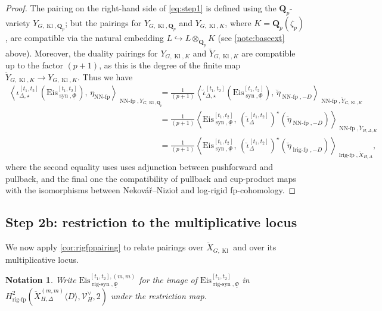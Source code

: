 \documentclass[cjm]{ipart}
\theoremstyle{plain}
\newtheorem{notation}[theorem]{Notation}
\theoremstyle{remark}
\DeclareMathOperator{\Kl}{Kl}
\DeclareMathOperator{\lrigfp}{lrig-fp}
\DeclareMathOperator{\NNfp}{NN-fp}
\DeclareMathOperator{\rigfp}{rig-fp}
\DeclareMathOperator{\rigsyn}{rig-syn}
\DeclareMathOperator{\syn}{syn}
\newcommand{\Eis}{\mathrm{Eis}}
\newcommand{\Nek}{Nekov\'a\v{r}\xspace}
\newcommand{\Niz}{Nizio\l\xspace}
\newcommand{\QQ}{\mathbf{Q}}
\newcommand{\Qp}{\QQ_p}
\newcommand{\cV}{\mathcal{V}}
\newcommand{\into}{\hookrightarrow}
\numberwithin{equation}{subsection}
\begin{document}
  \begin{proof}
   The pairing on the right-hand side of \eqref{eq:step1} is defined using the $\Qp$-variety $Y_{G, \Kl, \Qp}$; but the pairings for $Y_{G, \Kl, \Qp}$ and $Y_{G, \Kl, K}$, where $K = \Qp(\zeta_p)$, are compatible via the natural embedding $L \into L \otimes_{\Qp} K$ (see \cref{note:baseext} above). Moreover, the duality pairings for $Y_{G, \Kl, K}$ and $\breve{Y}_{G, \Kl, K}$ are compatible up to the factor $(p+1)$, as this is the degree of the finite map $\breve{Y}_{G, \Kl, K} \to Y_{G, \Kl, K}$. Thus we have
   \begin{align*}
    \left\langle \iota_{\Delta, \star}^{[t_1,t_2]}( \Eis^{[t_1,t_2]}_{\syn,\underline\Phi}),\,  \eta_{\NNfp}\right\rangle_{\NNfp,Y_{G,\Kl, \Qp}}
    &= \tfrac{1}{(p+1)} \left \langle\breve{\iota}_{\Delta, \star}^{[t_1,t_2]}( \Eis^{[t_1,t_2]}_{\syn,\underline\Phi}),\,  \breve\eta_{\NNfp, -D} \right\rangle_{\NNfp,\breve{Y}_{G,\Kl, K}} \\
    &= \tfrac{1}{(p+1)} \left\langle \Eis^{[t_1,t_2]}_{\syn,\underline\Phi},\,  (\breve\iota_{\Delta}^{[t_1,t_2]})^\star \left( \breve\eta_{\NNfp, -D}\right) \right\rangle_{\NNfp,\breve{Y}_{H,\Delta, K}} \\
    &= \tfrac{1}{(p+1)} \left\langle \Eis^{[t_1,t_2]}_{\syn,\underline\Phi},\,  (\breve\iota_{\Delta}^{[t_1,t_2]})^\star \left( \breve\eta_{\lrigfp, -D}\right) \right\rangle_{\lrigfp,\breve{X}_{H,\Delta}},
   \end{align*}
   where the second equality uses uses adjunction between pushforward and pullback, and the final one the compatibility of pullback and cup-product maps with the isomorphisms between \Nek--\Niz and log-rigid fp-cohomology.
  \end{proof}

 \subsection{Step 2b: restriction to the multiplicative locus}

  \label{sect:reduction2}
  We now apply \cref{cor:rigfppairing} to relate pairings over $\breve{X}_{G,\Kl}$ and over its multiplicative locus.

  \begin{notation}
   Write $\Eis^{[t_1,t_2],(m,m)}_{\rigsyn,\underline\Phi}$ for the image of $\Eis^{[t_1,t_2]}_{\rigsyn,\underline\Phi}$ in $H^2_{\rigfp}\left(\breve{X}_{H,\Delta}^{(m, m)}\langle D \rangle,\cV_H^\vee ,2\right)$ under the restriction map.
  \end{notation}
\end{document}
